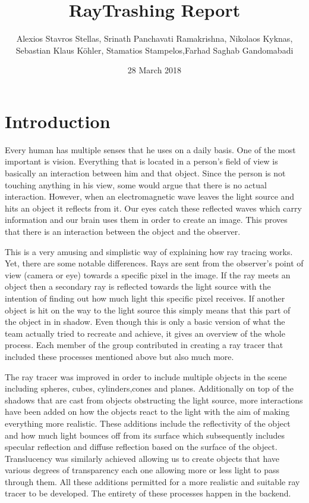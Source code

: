 \documentclass[10pt]{scrartcl}
\begin{document}
 

\title{RayTrashing Report}
\author{\small Alexios Stavros Stellas, Srinath Panchavati Ramakrishna, Nikolaos Kyknas, \\ \small Sebastian Klaus Köhler, Stamatios Stampelos,Farhad Saghab Gandomabadi}
\date{28 March 2018}

\maketitle

\section{Introduction}
Every human has multiple senses that he uses on a daily basis. One of the most important is vision. Everything that is located in a person’s field of view is basically an interaction between him and that object. Since the person is not touching anything in his view, some would argue that there is no actual interaction. However, when an electromagnetic wave leaves the light source and hits an object it reflects from it. Our eyes catch these reflected waves which carry information and our brain uses them in order to create an image. This proves that there is an interaction between the object and the observer. \par
This is a very amusing and simplistic way of explaining how ray tracing works. Yet, there are some notable differences. Rays are sent from the observer’s point of view (camera or eye) towards a specific pixel in the image. If the ray meets an object then a secondary ray is reflected towards the light source with the intention of finding out how much light this specific pixel receives. If another object is hit on the way to the light source this simply means that this part of the object in in shadow. Even though this is only a basic version of what the team actually tried to recreate and achieve, it gives an overview of the whole process. Each member of the group contributed in creating a ray tracer that included these processes mentioned above but also much more.\par
 The ray tracer was improved in order to include multiple objects in the scene including spheres, cubes, cylinders,cones and planes. Additionally on top of the shadows that are cast from objects obstructing the light source, more interactions have been added on how the objects react to the light with the aim of making everything more realistic. These additions include the reflectivity of the object and how much light bounces off from its surface which subsequently includes specular reflection and diffuse reflection based on the surface of the object.  Translucency was similarly achieved allowing us to create objects that have various degrees of transparency each one allowing more or less light to pass through them. All these additions permitted for a more realistic and suitable ray tracer to be developed.  The entirety of these processes happen in the backend. \par
\end{document}
